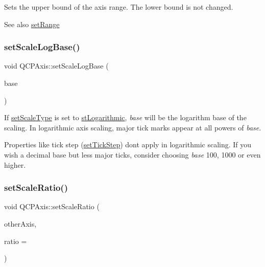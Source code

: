 Sets the upper bound of the axis range. The lower bound is not changed. \begin{DoxySeeAlso}{See also}
\mbox{\hyperlink{class_q_c_p_axis_aebdfea5d44c3a0ad2b4700cd4d25b641}{set\+Range}} 
\end{DoxySeeAlso}
\mbox{\label{class_q_c_p_axis_a726186054be90487885a748aa1b42188}} 
\subsubsection{\texorpdfstring{set\+Scale\+Log\+Base()}{setScaleLogBase()}}
{\footnotesize\ttfamily void Q\+C\+P\+Axis\+::set\+Scale\+Log\+Base (\begin{DoxyParamCaption}\item[{double}]{base }\end{DoxyParamCaption})}

If \mbox{\hyperlink{class_q_c_p_axis_adef29cae617af4f519f6c40d1a866ca6}{set\+Scale\+Type}} is set to \mbox{\hyperlink{class_q_c_p_axis_a36d8e8658dbaa179bf2aeb973db2d6f0abf5b785ad976618816dc6f79b73216d4}{st\+Logarithmic}}, {\itshape base} will be the logarithm base of the scaling. In logarithmic axis scaling, major tick marks appear at all powers of {\itshape base}.

Properties like tick step (\mbox{\hyperlink{class_q_c_p_axis_af727db0acc6492c4c774c0700e738205}{set\+Tick\+Step}}) don\textquotesingle{}t apply in logarithmic scaling. If you wish a decimal base but less major ticks, consider choosing {\itshape base} 100, 1000 or even higher. \mbox{\label{class_q_c_p_axis_af4bbd446dcaee5a83ac30ce9bcd6e125}} 
\subsubsection{\texorpdfstring{set\+Scale\+Ratio()}{setScaleRatio()}}
{\footnotesize\ttfamily void Q\+C\+P\+Axis\+::set\+Scale\+Ratio (\begin{DoxyParamCaption}\item[{const \mbox{\hyperlink{class_q_c_p_axis}{Q\+C\+P\+Axis}} $\ast$}]{other\+Axis,  }\item[{double}]{ratio = {} }\end{DoxyParamCaption})}

